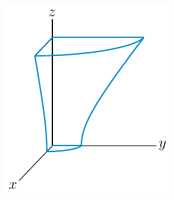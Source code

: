 \begin{answer}
\begin{center}
   \includegraphics{fig/OE226_09A_l.pdf}\qquad\qquad
\end{center}
\end{answer}

